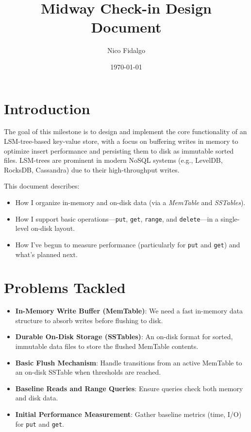 \documentclass[10pt]{article}
\title{Midway Check-in Design Document}
\author{Nico Fidalgo}
\date{\today}
\begin{document}
\maketitle

\section{Introduction}
The goal of this milestone is to design and implement the core functionality of an LSM-tree-based key-value store, with a focus on buffering writes in memory to optimize insert performance and persisting them to disk as immutable sorted files. LSM-trees are prominent in modern NoSQL systems (e.g., LevelDB, RocksDB, Cassandra) due to their high-throughput writes.

This document describes:
\begin{itemize}
  \item How I organize in-memory and on-disk data (via a \emph{MemTable} and \emph{SSTables}).
  \item How I support basic operations---\texttt{put}, \texttt{get}, \texttt{range}, and \texttt{delete}---in a single-level on-disk layout.
  \item How I've begun to measure performance (particularly for \texttt{put} and \texttt{get}) and what's planned next.
\end{itemize}

\section{Problems Tackled}
\begin{itemize}
  \item \textbf{In-Memory Write Buffer (MemTable)}: We need a fast in-memory data structure to absorb writes before flushing to disk.
  \item \textbf{Durable On-Disk Storage (SSTables)}: An on-disk format for sorted, immutable data files to store the flushed MemTable contents.
  \item \textbf{Basic Flush Mechanism}: Handle transitions from an active MemTable to an on-disk SSTable when thresholds are reached.
  \item \textbf{Baseline Reads and Range Queries}: Ensure queries check both memory and disk data.
  \item \textbf{Initial Performance Measurement}: Gather baseline metrics (time, I/O) for \texttt{put} and \texttt{get}.
\end{itemize}
\end{document}

